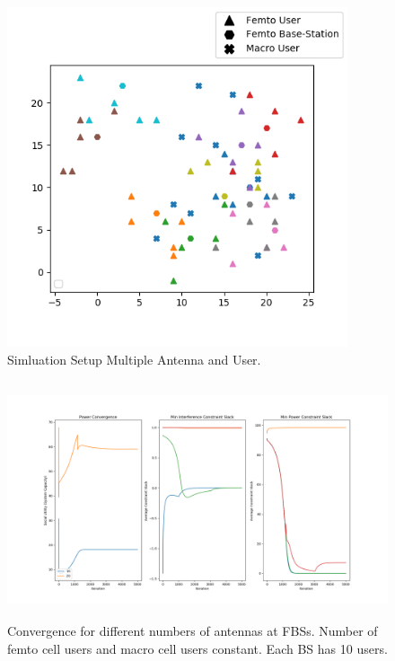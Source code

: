 \documentclass[12pt,a4paper]{report}
\begin{document}
\begin{figure}[H]
	\includegraphics[width=\textwidth,height = 10cm]{figures/system_figure_multiple}
	  \caption{Simluation Setup Multiple Antenna and User.
	  }
\end{figure}


\begin{figure}[H]
	  	\includegraphics[width=\textwidth,height = 7cm]{figures/increasing_antenna}
	  		  \caption{Convergence for different numbers of antennas at FBSs. Number of femto cell users and macro cell users constant. Each BS has 10 users.}
	  \label{fig:}
\end{figure}

%
\end{document}
